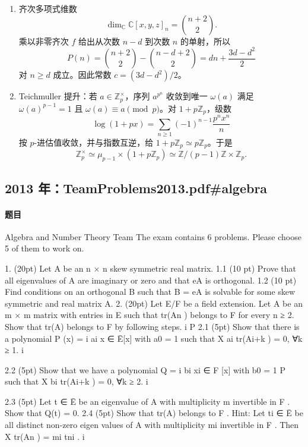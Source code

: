 \documentclass[UTF8,12pt]{ctexart}
\begin{document}
\begin{enumerate}[label=\textbf{\arabic*.},leftmargin=2.2em]
\[\]
其 universal covering group 是把 \(K=SO(2)\) 的角变量 \(\theta\) 提升为实变量的 Lie 群；作为流形可写为 \(\mathbb R\times A\times N\)，覆盖映射把 \(\theta\) 模 \(2\pi\) 后再乘 Iwasawa 分解。
\item 齐次多项式维数
\[
\dim_\mathbb C\mathbb C[x,y,z]_n=\binom{n+2}{2}.
\]
乘以非零齐次 \(f\) 给出从次数 \(n-d\) 到次数 \(n\) 的单射，所以
\[
P(n)=\binom{n+2}{2}-\binom{n-d+2}{2}=dn+\frac{3d-d^2}{2}
\]
对 \(n\ge d\) 成立。因此常数 \(c=(3d-d^2)/2\)。
\item Teichmuller 提升：若 \(a\in\mathbb Z_p^\times\)，序列 \(a^{p^n}\) 收敛到唯一 \(\omega(a)\) 满足 \(\omega(a)^{p-1}=1\) 且 \(\omega(a)\equiv a\pmod p\)。对 \(1+p\mathbb Z_p\)，级数
\[
\log(1+px)=\sum_{n\ge1}(-1)^{n-1}\frac{p^nx^n}{n}
\]
按 \(p\)-进估值收敛，并与指数互逆，给 \(1+p\mathbb Z_p\simeq p\mathbb Z_p\)。于是
\[
\mathbb Z_p^\times\simeq \mu_{p-1}\times(1+p\mathbb Z_p)\simeq \mathbb Z/(p-1)\mathbb Z\times\mathbb Z_p .
\]
\end{enumerate}

\subsection{2013 年：TeamProblems2013.pdf\#algebra}
\paragraph{题目}
Algebra and Number Theory Team The exam contains 6 problems. Please choose 5 of them to work on.

1. (20pt) Let A be an n × n skew symmetric real matrix. 1.1 (10 pt) Prove that all eigenvalues of A are imaginary or zero and that eA is orthogonal. 1.2 (10 pt) Find conditions on an orthogonal B such that B = eA is solvable for some skew symmetric and real matrix A. 2. (20pt) Let E/F be a field extension. Let A be an m × m matrix with entries in E such that tr(An ) belongs to F for every n ≥ 2. Show that tr(A) belongs to F by following steps. i P 2.1 (5pt) Show that there is a polynomial P (x) = i ai x ∈ Ē[x] with a0 = 1 such that X ai tr(Ai+k ) = 0, ∀k ≥ 1. i

2.2 (5pt) Show that we have a polynomial Q = i bi xi ∈ F [x] with b0 = 1 P such that X bi tr(Ai+k ) = 0, ∀k ≥ 2. i

2.3 (5pt) Let t ∈ Ē be an eigenvalue of A with multiplicity m invertible in F . Show that Q(t) = 0. 2.4 (5pt) Show that tr(A) belongs to F . Hint: Let ti ∈ Ē be all distinct non-zero eigen values of A with multiplicity mi invertible in F . Then X tr(An ) = mi tni . i
\end{document}

